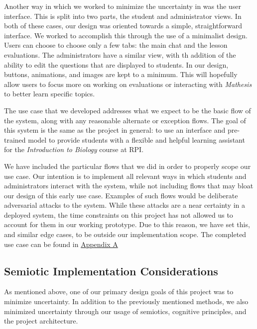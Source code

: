 \documentclass[12pt,a4paper]{article}
\begin{document}
    Another way in which we worked to minimize the uncertainty in was the user interface.  This is
    split into two parts, the student and administrator views.  In both of these cases, our design
    was oriented towards a simple, straightforward interface.  We worked to accomplish this through
    the use of a minimalist design.  Users can choose to choose only a few tabs: the main chat and
    the lesson evaluations.  The administrators have a similar view, with th addition of the ability
    to edit the questions that are displayed to students.  In our design, buttons, animations, and
    images are kept to a minimum.  This will hopefully allow users to focus more on working on
    evaluations or interacting with \textit{Mathesis} to better learn specific topics.

    The use case that we developed addresses what we expect to be the basic flow of the system, along
    with any reasonable alternate or exception flows.  The goal of this system is the same as the
    project in general: to use an interface and pre-trained model to provide students with a flexible
    and helpful learning assistant for the \textit{Introduction to Biology} course at RPI.

    We have included the particular flows that we did in order to properly scope our use case.  Our intention
    is to implement all relevant ways in which students and administrators interact with the system,
    while not including flows that may bloat our design of this early use case.  Examples
    of such flows would be deliberate adversarial attacks to the system.  While these attacks are a
    near certainty in a deployed system, the time constraints on this project has not allowed us to
    account for them in our working prototype. Due to this reason, we have set this, and similar
    edge cases, to be outside our implementation scope.  The completed use case can be found in
    \hyperref[tab:useCaseDoc1]{Appendix A}

    \subsection{Semiotic Implementation Considerations}

    As mentioned above, one of our primary design goals of this project was to minimize uncertainty.
    In addition to the previously mentioned methods, we also minimized uncertainty through our
    usage of semiotics, cognitive principles, and the project architecture.
\end{document}
